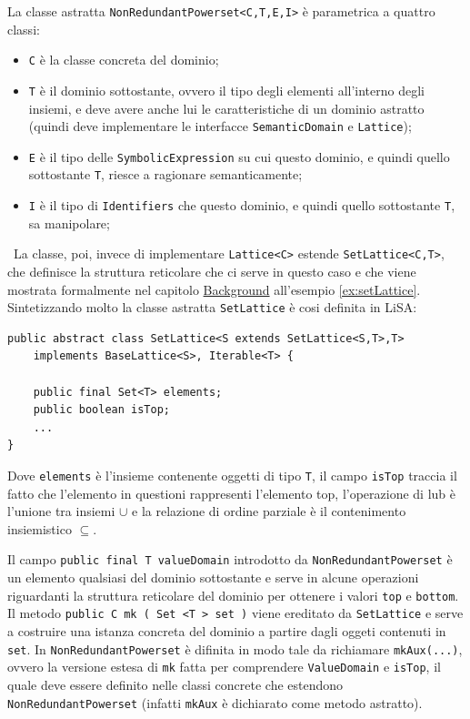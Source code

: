 La classe astratta \texttt{NonRedundantPowerset<C,T,E,I>} è parametrica a quattro classi:
\begin{itemize}
    \itemsep0pt
    \item \texttt{C} è la classe concreta del dominio;
    \item \texttt{T} è il dominio sottostante, ovvero il tipo degli elementi all'interno degli insiemi, e deve avere anche lui le caratteristiche di un dominio astratto (quindi deve implementare le interfacce \texttt{SemanticDomain} e \texttt{Lattice});
    \item \texttt{E} è il tipo delle \texttt{SymbolicExpression} su cui questo dominio, e quindi quello sottostante \texttt{T}, riesce a ragionare semanticamente;
    \item \texttt{I} è il tipo di \texttt{Identifiers} che questo dominio,  e quindi quello sottostante \texttt{T}, sa manipolare;
\end{itemize}\ 
La classe, poi, invece di implementare \texttt{Lattice<C>} estende \texttt{SetLattice<C,T>}, che definisce la struttura reticolare che ci serve in questo caso e che viene mostrata formalmente nel capitolo \hyperref[chapter:background]{Background} all'esempio \ref{ex:setLattice}. Sintetizzando molto la classe astratta \texttt{SetLattice} è cosi definita in LiSA:
\begin{lstlisting}[belowskip=-1.1 \baselineskip]
public abstract class SetLattice<S extends SetLattice<S,T>,T> 
    implements BaseLattice<S>, Iterable<T> {

    public final Set<T> elements;
    public boolean isTop;
    ...
}
\end{lstlisting}
Dove \texttt{elements} è l'insieme contenente oggetti di tipo \texttt{T}, il campo \texttt{isTop} traccia il fatto che l'elemento in questioni rappresenti l'elemento top, l'operazione di lub è l'unione tra insiemi \(\cup\) e la relazione di ordine parziale è il contenimento insiemistico \(\subseteq\).

Il campo \texttt{public final T valueDomain} introdotto da \texttt{NonRedundantPowerset} è un elemento qualsiasi del dominio sottostante e serve in alcune operazioni riguardanti la struttura reticolare del dominio per ottenere i valori \texttt{top} e \texttt{bottom}. Il metodo \texttt{public C mk ( Set <T > set )} viene ereditato da \texttt{SetLattice} e serve a costruire una istanza concreta del dominio a partire dagli oggeti contenuti in \texttt{set}. In \texttt{NonRedundantPowerset} è difinita in modo tale da richiamare \texttt{mkAux(...)}, ovvero la versione estesa di \texttt{mk} fatta per comprendere \texttt{ValueDomain} e \texttt{isTop}, il quale deve essere definito nelle classi concrete che estendono \texttt{NonRedundantPowerset} (infatti \texttt{mkAux} è dichiarato come metodo astratto).

